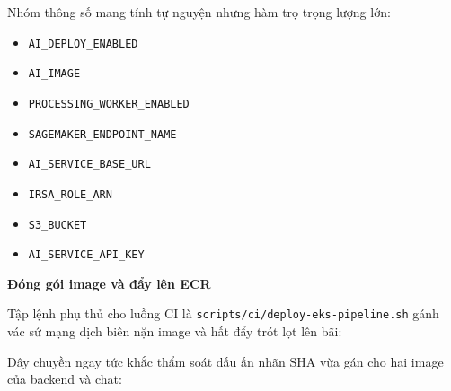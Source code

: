 Nhóm thông số mang tính tự nguyện nhưng hàm trọ trọng lượng lớn:

\begin{itemize}
\tightlist
\item
  \texttt{AI\_\allowbreak{}DEPLOY\_\allowbreak{}ENABLED}
\item
  \texttt{AI\_\allowbreak{}IMAGE}
\item
  \texttt{PROCESSING\_\allowbreak{}WORKER\_\allowbreak{}ENABLED}
\item
  \texttt{SAGEMAKER\_\allowbreak{}ENDPOINT\_\allowbreak{}NAME}
\item
  \texttt{AI\_\allowbreak{}SERVICE\_\allowbreak{}BASE\_\allowbreak{}URL}
\item
  \texttt{IRSA\_\allowbreak{}ROLE\_\allowbreak{}ARN}
\item
  \texttt{S3\_\allowbreak{}BUCKET}
\item
  \texttt{AI\_\allowbreak{}SERVICE\_\allowbreak{}API\_\allowbreak{}KEY}
\end{itemize}

\vspace{0.5em}\noindent\textbf{Đóng gói image và đẩy lên
ECR}\par

Tập lệnh phụ thủ cho luồng CI là
\texttt{scripts/\allowbreak{}ci/\allowbreak{}deploy-\allowbreak{}eks-\allowbreak{}pipeline.\allowbreak{}sh} gánh vác sứ mạng dịch biên
nặn image và hất đẩy trót lọt lên bãi:

\begin{Shaded}
\begin{Highlighting}[]
\end{Highlighting}
\end{Shaded}

Dây chuyền ngay tức khắc thẩm soát dấu ấn nhãn SHA vừa gán cho hai image
của backend và chat:

\begin{Shaded}
\begin{Highlighting}[]
\DataTypeTok{\textbackslash{}}
  \DataTypeTok{\textbackslash{}}
  \DataTypeTok{\textbackslash{}}
  \OperatorTok{\textless{}}\OperatorTok{\textgreater{}}

\DataTypeTok{\textbackslash{}}
  \DataTypeTok{\textbackslash{}}
  \DataTypeTok{\textbackslash{}}
  \OperatorTok{\textless{}}\OperatorTok{\textgreater{}}
\end{Highlighting}
\end{Shaded}

